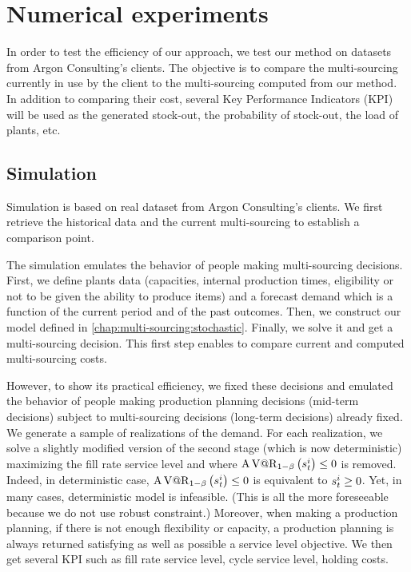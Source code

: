 \chapter{Numerical experiments}
\label{chap:multi-sourcing:numerical-experiments}


In order to test the efficiency of our approach, we test our method on datasets from Argon Consulting’s clients.
The objective is to compare the multi-sourcing currently in use by the client to the multi-sourcing computed from our method.
In addition to comparing their cost, several Key Performance Indicators (KPI) will be used as the generated stock-out, the probability of stock-out, the load of plants, etc.


\section{Simulation}


Simulation is based on real dataset from Argon Consulting’s clients.
We first retrieve the historical data and the current multi-sourcing to establish a comparison point.


The simulation emulates the behavior of people making multi-sourcing decisions.
First, we define plants data (capacities, internal production times, eligibility or not to be given the ability to produce items) and a forecast demand which is a function of the current period and of the past outcomes.
Then, we construct our model defined in \cref{chap:multi-sourcing:stochastic}.
Finally, we solve it and get a multi-sourcing decision.
This first step enables to compare current and computed multi-sourcing costs.


However, to show its practical efficiency, we fixed these decisions and emulated the behavior of people making production planning decisions (\ie mid-term decisions) subject to multi-sourcing decisions (\ie long-term decisions) already fixed.
We generate a sample of realizations of the demand.
For each realization, we solve a slightly modified version of the second stage (which is now deterministic) maximizing the fill rate service level and where $\AVaR_{1-\servicelvl}\bracket{\inventory_t^i}\le0$ is removed.
Indeed, in deterministic case, $\AVaR_{1-\servicelvl}\bracket{\inventory_t^i}\le0$ is equivalent to $s_t^i\ge0$.
Yet, in many cases, deterministic model is infeasible.
(This is all the more foreseeable because we do not use robust constraint.)
Moreover, when making a production planning, if there is not enough flexibility or capacity, a production planning is always returned satisfying as well as possible a service level objective.
We then get several KPI such as fill rate service level, cycle service level, holding costs.


